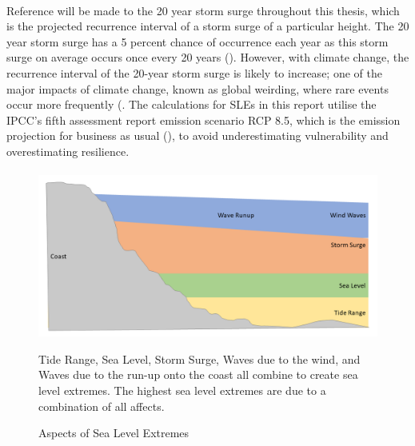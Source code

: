 \paragraph{}

Reference will be made to the 20 year storm surge throughout this thesis, which is the projected recurrence interval of a storm surge of a particular height.  The 20 year storm surge has a 5 percent chance of occurrence each year as this storm surge on average occurs once every 20 years (\cite{hanssen_saksframlegg_2013}). However, with climate change, the recurrence interval of the 20-year storm surge is likely to increase; one of the major impacts of climate change, known as global weirding, where rare events occur more frequently (\cite{wilson_when_2019}. The calculations for SLEs in this report utilise the IPCC's fifth assessment report emission scenario RCP 8.5, which is the emission projection for business as usual (\cite{hanssen-bauer_climate_2017}), to avoid underestimating vulnerability and overestimating resilience.  
\paragraph{}


\begin{figure}[h!]
    \centering
    \includegraphics[width=1\textwidth]{fig_theory/sea level extremes.png}
    \caption{Aspects of Sea Level Extremes}{ Tide Range, Sea Level, Storm Surge, Waves due to the wind, and Waves due to the run-up onto the coast all combine to create sea level extremes. The highest sea level extremes are due to a combination of all affects.}

    \label{fig:theory_SLE_cause}
\end{figure}

